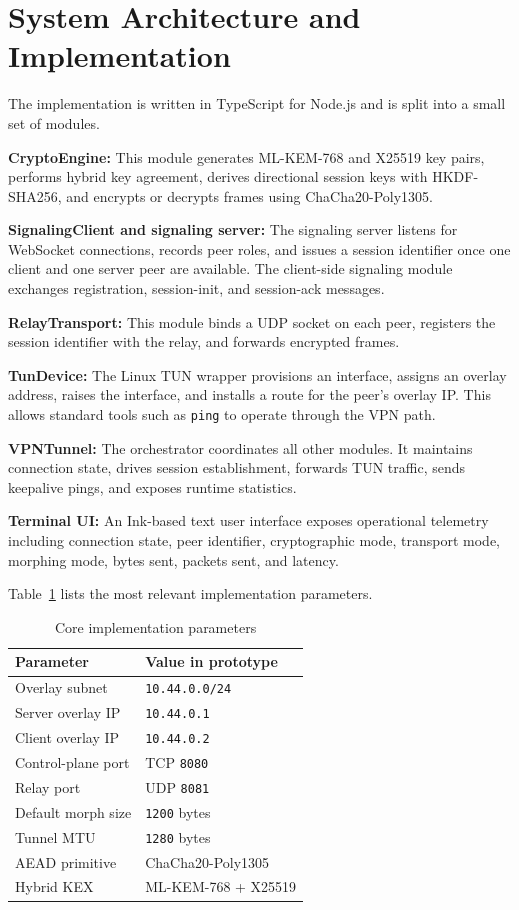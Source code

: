 \documentclass[conference]{IEEEtran}
\begin{document}
\section{System Architecture and Implementation}
The implementation is written in TypeScript for Node.js and is split into a small set of modules.

\textbf{CryptoEngine:} This module generates ML-KEM-768 and X25519 key pairs, performs hybrid key agreement, derives directional session keys with HKDF-SHA256, and encrypts or decrypts frames using ChaCha20-Poly1305.

\textbf{SignalingClient and signaling server:} The signaling server listens for WebSocket connections, records peer roles, and issues a session identifier once one client and one server peer are available. The client-side signaling module exchanges registration, session-init, and session-ack messages.

\textbf{RelayTransport:} This module binds a UDP socket on each peer, registers the session identifier with the relay, and forwards encrypted frames.

\textbf{TunDevice:} The Linux TUN wrapper provisions an interface, assigns an overlay address, raises the interface, and installs a route for the peer's overlay IP. This allows standard tools such as \texttt{ping} to operate through the VPN path.

\textbf{VPNTunnel:} The orchestrator coordinates all other modules. It maintains connection state, drives session establishment, forwards TUN traffic, sends keepalive pings, and exposes runtime statistics.

\textbf{Terminal UI:} An Ink-based text user interface exposes operational telemetry including connection state, peer identifier, cryptographic mode, transport mode, morphing mode, bytes sent, packets sent, and latency.

Table~\ref{tab:params} lists the most relevant implementation parameters.

\begin{table}[t]
\caption{Core implementation parameters}
\label{tab:params}
\centering
\begin{tabular}{p{3.2cm}p{10.4cm}}
\toprule
Parameter & Value in prototype \\
\midrule
Overlay subnet & \texttt{10.44.0.0/24} \\
Server overlay IP & \texttt{10.44.0.1} \\
Client overlay IP & \texttt{10.44.0.2} \\
Control-plane port & TCP \texttt{8080} \\
Relay port & UDP \texttt{8081} \\
Default morph size & \texttt{1200} bytes \\
Tunnel MTU & \texttt{1280} bytes \\
AEAD primitive & ChaCha20-Poly1305 \\
Hybrid KEX & ML-KEM-768 + X25519 \\
\bottomrule
\end{tabular}
\end{table}
\end{document}
